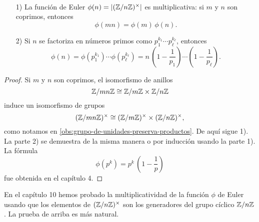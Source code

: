 \begin{corolario}
  ~

  \begin{enumerate}
  \item[1)] La función de Euler $\phi (n) = |(\mathbb{Z}/n\mathbb{Z})^\times|$ es
    multiplicativa: si $m$ y $n$ son coprimos, entonces
    $$\phi (mn) = \phi (m)\,\phi (n).$$

  \item[2)] Si $n$ se factoriza en números primos como
    $p_1^{k_1}\cdots p_\ell^{k_\ell}$, entonces
    \[ \phi (n) = \phi (p_1^{k_1})\cdots \phi (p_\ell^{k_\ell}) =
        n\,\left(1 - \frac{1}{p_1}\right)\cdots\left(1 - \frac{1}{p_\ell}\right). \]
  \end{enumerate}

  \begin{proof}
    Si $m$ y $n$ son coprimos, el isomorfismo de anillos
    $$\mathbb{Z}/mn\mathbb{Z} \cong \mathbb{Z}/m\mathbb{Z} \times \mathbb{Z}/n\mathbb{Z}$$
    induce un isomorfismo de grupos
    $$(\mathbb{Z}/mn\mathbb{Z})^\times \cong (\mathbb{Z}/m\mathbb{Z})^\times \times (\mathbb{Z}/n\mathbb{Z})^\times,$$
    como notamos en \ref{obs:grupo-de-unidades-preserva-productos}. De aquí
    sigue 1). La parte 2) se demuestra de la misma manera o por inducción usando
    la parte 1). La fórmula
    $$\phi (p^k) = p^k\,\left(1 - \frac{1}{p}\right)$$
    fue obtenida en el capítulo 4.
  \end{proof}
\end{corolario}

En el capítulo 10 hemos probado la multiplicatividad de la función $\phi$
de Euler usando que los elementos de $(\mathbb{Z}/n\mathbb{Z})^\times$ son los generadores
del grupo cíclico $\mathbb{Z}/n\mathbb{Z}$. La prueba de arriba es más natural.
